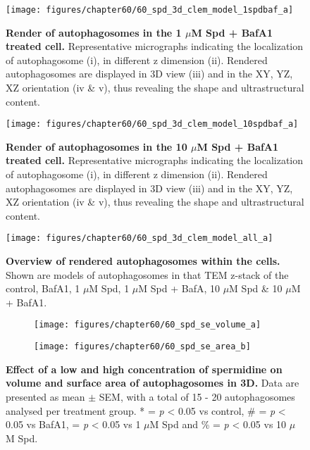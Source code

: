 \begin{figure}[!htbp]
\center
  \texttt{[image: figures/chapter60/60\_spd\_3d\_clem\_model\_1spdbaf\_a]}
  \caption[Render of autophagosomes in the 1 $\mu$M Spd  + BafA1 treated cell]{\textbf{Render of autophagosomes in the 1 $\mu$M Spd  + BafA1 treated cell.} Representative micrographs indicating the localization of autophagosome (i), in different z dimension (ii). Rendered autophagosomes are displayed in 3D view (iii) and in the XY, YZ, XZ orientation  (iv \& v), thus revealing the shape and ultrastructural content.}
  \label{fig:60_spd_3d_clem_model_1spdbaf_a}
\end{figure} 

\begin{figure}[!htbp]
\center
  \texttt{[image: figures/chapter60/60\_spd\_3d\_clem\_model\_10spdbaf\_a]}
  \caption[Render of autophagosomes in the 10 $\mu$M Spd  + BafA1 treated cell]{\textbf{Render of autophagosomes in the 10 $\mu$M Spd  + BafA1 treated cell.} Representative micrographs indicating the localization of autophagosome (i), in different z dimension (ii). Rendered autophagosomes are displayed in 3D view (iii) and in the XY, YZ, XZ orientation  (iv \& v), thus revealing the shape and ultrastructural content.}
  \label{fig:60_spd_3d_clem_model_10spdbaf_a}
\end{figure} 

\begin{landscape}
\begin{figure}[!htbp]
\center
  \texttt{[image: figures/chapter60/60\_spd\_3d\_clem\_model\_all\_a]}
  \caption[Overview of rendered autophagosomes within the cells]{\textbf{Overview of rendered autophagosomes within the cells.} Shown are models of autophagosomes in that TEM z-stack of the control, BafA1, 1 $\mu$M Spd, 1 $\mu$M Spd + BafA, 10 $\mu$M Spd \& 10 $\mu$M + BafA1.}
  \label{fig:60_spd_3d_clem_model_all_a}
\end{figure} 
\end{landscape}

\begin{figure}[!htbp]
  \begin{subfigure}[b]{0.495\linewidth}
    \texttt{[image: figures/chapter60/60\_spd\_se\_volume\_a]}
  \end{subfigure}
  \begin{subfigure}[b]{0.495\linewidth}
    \texttt{[image: figures/chapter60/60\_spd\_se\_area\_b]}
  \end{subfigure}
    \caption[Effect of a low and high concentration of spermidine on volume and surface area of autophagosomes in 3D]{\textbf{Effect of a low and high concentration of spermidine on volume and surface area of autophagosomes in 3D.} Data are presented as mean $\pm$ SEM, with a total of 15 - 20 autophagosomes analysed per treatment group. * = \textit{p} < 0.05 vs control, \# = \textit{p} < 0.05 vs BafA1, \@ = \textit{p} < 0.05 vs 1 $\mu$M Spd and \% = \textit{p} < 0.05 vs 10 $\mu$M Spd.}
  \label{fig:60_spd_se_volume_a}
\end{figure}

